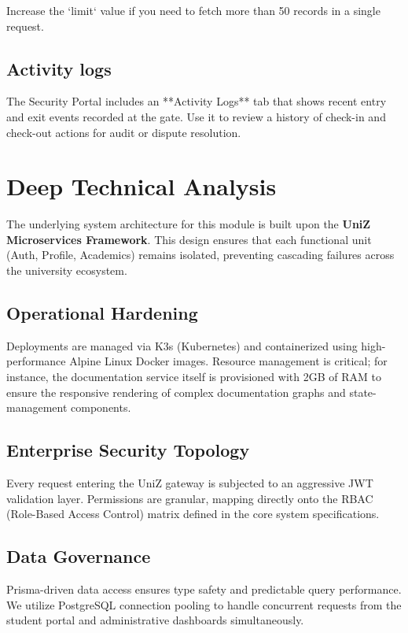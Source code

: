 Increase the `limit` value if you need to fetch more than 50 records in a single request.

\subsection{Activity logs}

The Security Portal includes an **Activity Logs** tab that shows recent entry and exit events recorded at the gate. Use it to review a history of check-in and check-out actions for audit or dispute resolution.


\section{Deep Technical Analysis}
The underlying system architecture for this module is built upon the \textbf{UniZ Microservices Framework}. 
This design ensures that each functional unit (Auth, Profile, Academics) remains isolated, preventing cascading failures across the university ecosystem.

\subsection{Operational Hardening}
Deployments are managed via K3s (Kubernetes) and containerized using high-performance Alpine Linux Docker images. 
Resource management is critical; for instance, the documentation service itself is provisioned with 2GB of RAM to ensure the responsive rendering of complex documentation graphs and state-management components.

\subsection{Enterprise Security Topology}
Every request entering the UniZ gateway is subjected to an aggressive JWT validation layer. 
Permissions are granular, mapping directly onto the RBAC (Role-Based Access Control) matrix defined in the core system specifications.

\subsection{Data Governance}
Prisma-driven data access ensures type safety and predictable query performance. 
We utilize PostgreSQL connection pooling to handle concurrent requests from the student portal and administrative dashboards simultaneously.
